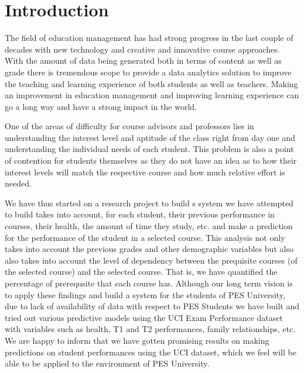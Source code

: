 \documentclass[conference]{IEEEtran}
\begin{document}
	\section{Introduction}
The field of education management has had strong progress in the last couple of decades with new technology and creative and innovative course approaches. With the amount of data being generated both in terms of content as well as grade there is tremendous scope to provide a data analytics solution to improve the teaching and learning experience of both students as well as teachers. Making an improvement in education management and improving learning experience can go a long way and have a strong impact in the world.

One of the areas of difficulty for course advisors and professors lies in understanding the interest level and aptitude of the class right from day one and understanding the individual needs of each student. This problem is also a point of contention for students themselves as they do not have an idea as to how their interest levels will match the respective course and how much relative effort is needed. 

We have thus started on a research project to build s system we have attempted to build takes into account, for each student, their previous performance in courses, their health, the amount of time they study, etc. and make a prediction for the performance of the student in a selected course. This analysis not only takes into account the previous grades and other demographic variables but also also takes into account the level of dependency between the prequisite courses (of the selected course) and the selected course. That is, we have quantified the percentage of prerequsite that each course has. Although our long term vision is to apply these findings and build a system for the students of PES University, due to lack of availability of data with respect to PES Students we have built and tried out various predictive models using the UCI Exam Performance dataset with variables such as health, T1 and T2 performances, family relationships, etc. We are happy to inform that we have gotten promising results on making predictions on student performances using the UCI dataset, which we feel will be able to be applied to the environment of PES University.

\end{document}
